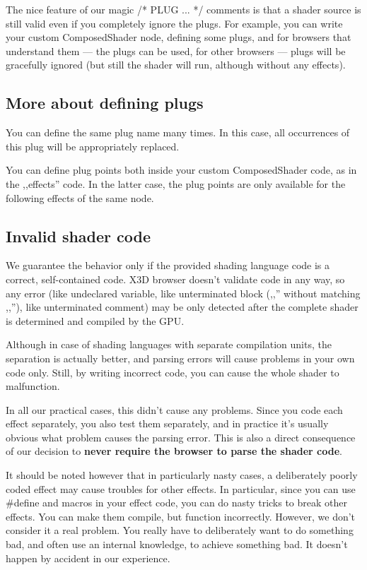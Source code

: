 \documentclass{acmsiggraph}                     %
\begin{document}
The nice feature of our magic /* PLUG ... */ comments is that a shader source
is still valid even if you completely ignore the plugs. For example,
you can write your custom ComposedShader node, defining some plugs,
and for browsers that understand them --- the plugs can be used,
for other browsers --- plugs will be gracefully ignored (but still
the shader will run, although without any effects).

\subsection{More about defining plugs}

You can define the same plug name many times. In this case,
all occurrences of this plug will be appropriately replaced.

You can define plug points both inside your custom ComposedShader code,
as in the ,,effects'' code. In the latter case, the plug points
are only available for the following effects of the same node.

\subsection{Invalid shader code}

We guarantee the behavior only if the provided shading language code
is a correct, self-contained code.
X3D browser doesn't validate code in any way, so any error (like undeclared
variable, like unterminated block (,,{'' without matching ,,}''),
like unterminated comment) may be only detected after the complete shader
is determined and compiled by the GPU.

Although in case of shading languages with separate compilation units,
the separation is actually better, and parsing errors will cause
problems in your own code only. Still, by writing incorrect code,
you can cause the whole shader to malfunction.

In all our practical cases, this didn't cause any problems.
Since you code each effect separately, you also test them separately,
and in practice it's usually obvious what problem causes the parsing error.
This is also a direct consequence of our decision to \textbf{never require
the browser to parse the shader code}.

It should be noted however that in particularly nasty cases,
a deliberately poorly coded effect may cause troubles for other effects.
In particular, since you can use \#define and macros in your effect code,
you can do nasty tricks to break other effects. You can make them compile,
but function incorrectly. However, we don't consider
it a real problem. You really have to deliberately want to do something bad,
and often use an internal knowledge, to achieve something bad.
It doesn't happen by accident in our experience.
\end{document}
